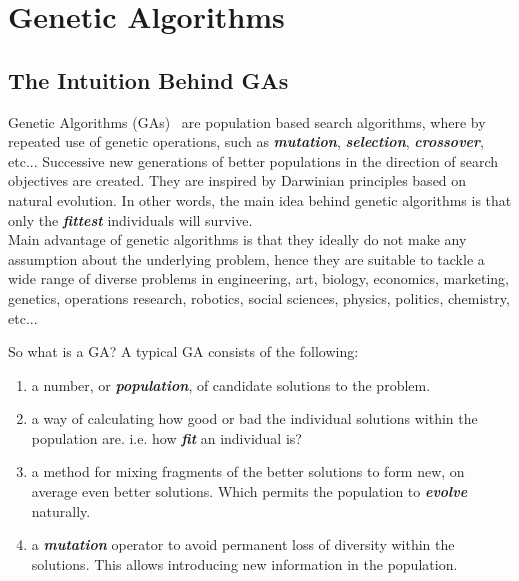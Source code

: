 \documentclass[12pt]{article}
\newcommand{\textem}[1]{\textbf{\textit{#1}}}
\begin{document}
\section{Genetic Algorithms}
\subsection{The Intuition Behind GAs}
Genetic Algorithms (GAs)~\cite{goldberg1989genetic} are population based
search algorithms, where by repeated use of genetic operations,
such as \textem{mutation}, \textem{selection}, \textem{crossover}, etc...
Successive new generations of better populations in the direction of
search objectives are created. They are inspired by Darwinian principles
based on natural evolution. In other words, the main idea behind genetic
algorithms is that only the \textem{fittest} individuals will survive.\\
Main advantage of genetic algorithms is that they ideally do not make
any assumption about the underlying problem, hence they are suitable to tackle
a wide range of diverse problems in
engineering, art, biology, economics, marketing, genetics,
operations research, robotics, social sciences, physics, politics, chemistry,
etc...

\noindent
So what is a GA? A typical GA consists of the following:
\vspace{-5mm}
\begin{enumerate}
\setlength{\parskip}{0em}
\item a number, or \textem{population}, of candidate solutions to the problem.
\item a way of calculating how good or bad the individual solutions within the
population are. i.e. how \textem{fit} an individual is?
\item a method for mixing fragments of the better solutions to form new, on
average even better solutions. Which permits the population to \textem{evolve} naturally.
\item a \textem{mutation} operator to avoid permanent loss of diversity within the
solutions. This allows introducing new information in the population.
\end{enumerate}
\end{document}
